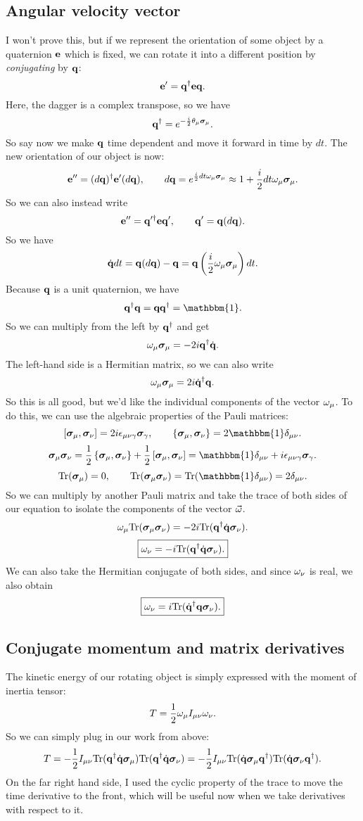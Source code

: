 \documentclass[12pt]{article}
\begin{document}
\subsection{Angular velocity vector}
I won't prove this, but if we represent the orientation of some object by a 
quaternion $\mathbf{e}$ which is fixed, we can rotate it into a different position 
by \emph{conjugating} by $\mathbf{q}$:
\[ \mathbf{e}' = \mathbf{q^\dagger eq}.\]
Here, the dagger is a complex transpose, so we have
\[ \mathbf{q}^\dagger = e^{-\frac{i}{2}\theta_\mu \bm{\sigma}_\mu}.\]
So say now we make $\mathbf{q}$ time dependent and move it forward in time by $dt$. 
The new orientation of our object is now:
\[ \mathbf{e}'' = (d\mathbf{q})^\dagger \mathbf{e}' (d\mathbf{q}),\qquad d\mathbf{q} = e^{\frac{i}{2}dt 
\omega_\mu \bm{\sigma}_\mu} \approx 1 + \frac{i}{2}dt \omega_\mu \bm{\sigma}_\mu.\]
So we can also instead write
\[ \mathbf{e}'' = \mathbf{q}'^\dagger \mathbf{e} \mathbf{q}',\qquad \mathbf{q}' = \mathbf{q}(d\mathbf{q}).\]
So we have
\[ \dot{\mathbf{q}}dt = \mathbf{q}(d\mathbf{q}) - \mathbf{q} = \mathbf{q}\left(\frac{i}{2}\omega_\mu\bm{\sigma}_\mu\right) 
dt.\]
Because $\mathbf{q}$ is a unit quaternion, we have
\[ \bv q^\dagger \bv q = \bv q \bv q^\dagger = \mathbbm{1}.\]
So we can multiply from the left by $\mathbf{q}^\dagger$ and get
\[ \omega_\mu \bm{\sigma}_\mu = -2i\mathbf{q}^\dagger\dot{\mathbf{q}} .\]
The left-hand side is a Hermitian matrix, so we can also write
\[ \omega_\mu \bm{\sigma}_\mu = 2i \dot{\mathbf{q}}^\dagger \mathbf{q}.\]
So this is all good, but we'd like the individual components of the vector 
$\omega_\mu$. To do this, we can use the algebraic properties of the Pauli matrices:
\[ \left [ \Sig_\mu, \Sig_\nu \right ] = 2i \e_{\mu\nu\g} \Sig_\g,\qquad 
\left\{ \Sig_\mu, \Sig_\nu \right \} = 2\mathbbm{1}\d_{\mu \nu}.\]
\[ \Sig_\mu \Sig_\nu = \half{1}\left\{ \Sig_\mu, \Sig_\nu \right \} 
+ \half{1}\left [ \Sig_\mu,\Sig_\nu \right ] = \mathbbm{1}\d_{\mu\nu} + 
i\e_{\mu\nu\g}\Sig_\g.\]
\[ \mathrm{Tr}(\Sig_\mu) = 0,\qquad \mathrm{Tr}(\Sig_\mu\Sig_\nu) = 
\mathrm{Tr}(\mathbbm{1}\d_{\mu\nu}) = 2\d_{\mu\nu}.\]
So we can multiply by another Pauli matrix and take the trace of both sides of 
our equation to isolate the components of the vector $\vec{\omega}$.
\[ \omega_\mu\mathrm{Tr}(\bm{\sigma}_\mu \bm{\sigma}_\nu) = -2i \mathrm{Tr}(\mathbf{q}^\dagger \dot{\mathbf{q}} \bm{\sigma}_\nu).\]
\[ \boxed{ \omega_\nu = -i \mathrm{Tr}(\mathbf{q}^\dagger \dot{ \mathbf{q}} \bm{\sigma}_\nu).}\]
We can also take the Hermitian conjugate of both sides, and since $\omega_\nu$ is 
real, we also obtain
\[ \boxed{ \omega_\nu = i \mathrm{Tr} (\dot{\mathbf{q}}^\dagger \mathbf{q} \bm{\sigma}_\nu).}\]


\subsection{Conjugate momentum and matrix derivatives}
The kinetic energy of our rotating object is simply expressed with the moment 
of inertia tensor:
\[ T = \frac{1}{2} \omega_\mu I_{\mu\nu}\omega_\nu.\]
So we can simply plug in our work from above:
\[ T = -\frac{1}{2} I_{\mu\nu} \mathrm{Tr}(\mathbf{q} ^\dagger \dot{\mathbf{q}}\bm{\sigma}_\mu) 
\mathrm{Tr}(\mathbf{q} ^\dagger \dot{\mathbf{q}}\bm{\sigma}_\nu) = -\frac{1}{2}I_{\mu\nu} 
\mathrm{Tr}(\dot{\mathbf{q}}\bm{\sigma}_\mu\mathbf{q}^\dagger ) 
\mathrm{Tr}(\dot{\mathbf{q}}\bm{\sigma}_\nu\mathbf{q} ^\dagger ).\]
On the far right hand side, I used the cyclic property of the trace to move the 
time derivative to the front, which will be useful now when we take derivatives 
with respect to it.
\end{document}
